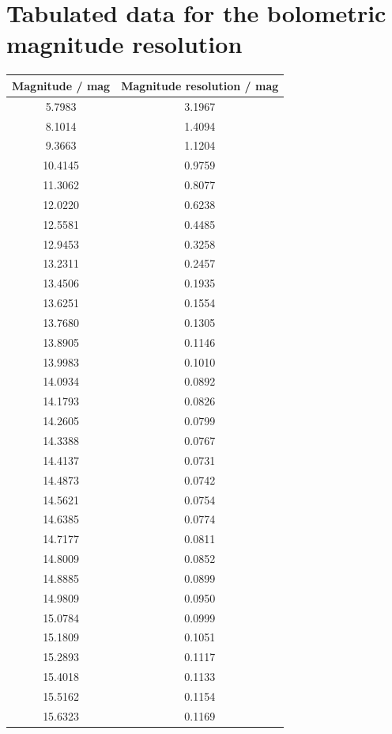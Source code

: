 \documentclass[fleqn,usenatbib]{mnras}
\begin{document}
\section{Tabulated data for the bolometric magnitude resolution}
\begin{table}
    \centering
    \begin{tabular}{c|c}
        Magnitude / mag & Magnitude resolution / mag \\\hline\hline
        5.7983 & 3.1967\\
        8.1014 & 1.4094\\
        9.3663 & 1.1204\\
        10.4145 & 0.9759\\
        11.3062 & 0.8077\\
        12.0220 & 0.6238\\
        12.5581 & 0.4485\\
        12.9453 & 0.3258\\
        13.2311 & 0.2457\\
        13.4506 & 0.1935\\\hline
        13.6251 & 0.1554\\
        13.7680 & 0.1305\\
        13.8905 & 0.1146\\
        13.9983 & 0.1010\\
        14.0934 & 0.0892\\
        14.1793 & 0.0826\\
        14.2605 & 0.0799\\
        14.3388 & 0.0767\\
        14.4137 & 0.0731\\
        14.4873 & 0.0742\\\hline
        14.5621 & 0.0754\\
        14.6385 & 0.0774\\
        14.7177 & 0.0811\\
        14.8009 & 0.0852\\
        14.8885 & 0.0899\\
        14.9809 & 0.0950\\
        15.0784 & 0.0999\\
        15.1809 & 0.1051\\
        15.2893 & 0.1117\\
        15.4018 & 0.1133\\\hline
        15.5162 & 0.1154\\
        15.6323 & 0.1169\\

\end{tabular}
\end{table}
\end{document}
